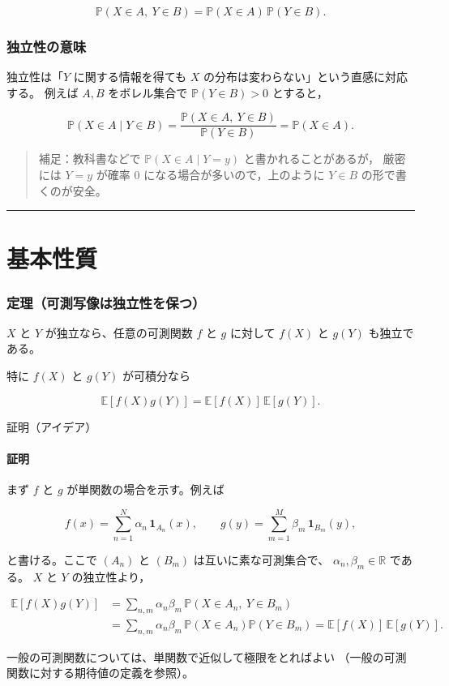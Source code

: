 \documentclass[uplatex,dvipdfmx,11pt,a4paper,openany]{bxjsbook}
\newenvironment{noteblock}{\begin{quote}\color{black!72}\small}{\end{quote}}
\begin{document}
\[\mathbb P(X\in A,\ Y\in B)
                = \mathbb P(X\in A)\,\mathbb P(Y\in B).\]

\subsubsection{独立性の意味}
独立性は「$Y$ に関する情報を得ても $X$ の分布は変わらない」という直感に対応する。
                例えば $A,B$ をボレル集合で $\mathbb P(Y\in B)>0$ とすると，

\[\mathbb P(X\in A\mid Y\in B)
                = \frac{\mathbb P(X\in A,\ Y\in B)}{\mathbb P(Y\in B)}
                = \mathbb P(X\in A).\]

\begin{noteblock}
補足：教科書などで $\mathbb P(X\in A\mid Y=y)$ と書かれることがあるが，
                厳密には $Y=y$ が確率 $0$ になる場合が多いので，上のように
                $Y\in B$ の形で書くのが安全。
\end{noteblock}

\medskip\hrule\medskip
\section{基本性質}
\subsubsection{定理（可測写像は独立性を保つ）}
$X$ と $Y$ が独立なら、任意の可測関数 $f$ と $g$ に対して $f(X)$ と $g(Y)$ も独立である。

特に $f(X)$ と $g(Y)$ が可積分なら

\[\mathbb E[f(X)g(Y)]
                = \mathbb E[f(X)]\,\mathbb E[g(Y)].\]

\begin{detailblock}{証明（アイデア）}
\paragraph{証明}
まず $f$ と $g$ が単関数の場合を示す。例えば

\[f(x)=\sum_{n=1}^{N}\alpha_n\,\mathbf 1_{A_n}(x),
                        \qquad
                        g(y)=\sum_{m=1}^{M}\beta_m\,\mathbf 1_{B_m}(y),\]

と書ける。ここで $(A_n)$ と $(B_m)$ は互いに素な可測集合で、
                        $\alpha_n,\beta_m\in\mathbb R$ である。
                        $X$ と $Y$ の独立性より，

\[\begin{aligned}
                        \mathbb E[f(X)g(Y)]
                        &= \sum_{n,m}\alpha_n\beta_m\,
                        \mathbb P(X\in A_n,\ Y\in B_m)\\
                        &= \sum_{n,m}\alpha_n\beta_m\,
                        \mathbb P(X\in A_n)\mathbb P(Y\in B_m)
                        = \mathbb E[f(X)]\,\mathbb E[g(Y)].
                        \end{aligned}\]

一般の可測関数については、単関数で近似して極限をとればよい
                        （一般の可測関数に対する期待値の定義を参照）。


\end{detailblock}
\end{document}
